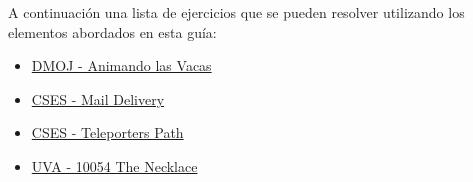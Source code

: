 A continuación una lista de ejercicios que se pueden resolver utilizando los elementos abordados en esta guía:

\begin{itemize}
	\item \href{https://dmoj.uclv.edu.cu/problem/cheer}{DMOJ - Animando las Vacas}
	\item \href{https://cses.fi/problemset/task/1691}{CSES - Mail Delivery}
	\item \href{https://cses.fi/problemset/task/1693}{CSES - Teleporters Path}
	\item \href{https://onlinejudge.org/index.php?option=onlinejudge&Itemid=8&page=show_problem&problem=995}{UVA - 10054 The Necklace}
\end{itemize}